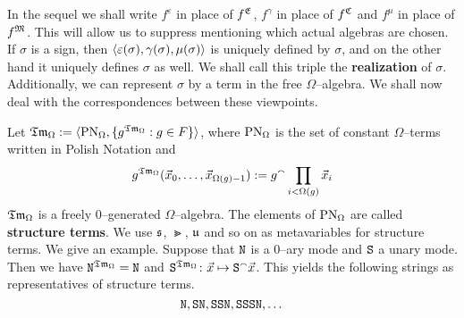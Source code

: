 In the sequel we shall write $f^{\varepsilon}$ in place of 
$f^{\mathfrak{E}}$, $f^{\gamma}$ in place of $f^{\mathfrak{C}}$ and $f^{\mu}$ in 
place of $f^{\mathfrak{M}}$. This will allow us to suppress mentioning 
which actual algebras are chosen. If $\sigma$ is a sign, then 
$\langle \varepsilon(\sigma), \gamma(\sigma), \mu(\sigma)\rangle$ is 
uniquely defined by $\sigma$, and on the other hand it uniquely 
defines $\sigma$ as well. We shall call this triple the 
\textbf{realization} of $\sigma$. Additionally,
we can represent $\sigma$ by a term in the free $\Omega$--algebra.
We shall now deal with the correspondences between these
viewpoints.

Let $\mathfrak{Tm}_{\Omega} := \langle \operatorname{PN}_{\Omega}, \{g^{\mathfrak{Tm}_{\Omega}} 
: g \in F\}\rangle$, where $\operatorname{PN}_{\Omega}$ is the set of constant $\Omega$--terms
written in Polish Notation and 
\begin{equation}
g^{\mathfrak{Tm}_{\Omega}}(\vec{x}_0, \dotsc, \vec{x}_{\Omega(g)-1}) :=
    g {^{\smallfrown}} \prod_{i < \Omega(g)} \vec{x}_i
\end{equation}
$\mathfrak{Tm}_{\Omega}$ is a freely 0--generated $\Omega$--algebra.
The elements of $\operatorname{PN}_{\Omega}$ are called 
\textbf{structure terms}.  We use $\mathfrak{s}$, $\Gt$, $\mathfrak{u}$ and so on 
as metavariables for structure terms. We give an example. Suppose 
that $\mbox{\tt N}$ is a
0--ary mode and $\mbox{\tt S}$ a unary mode. Then we have 
$\mbox{\tt N}^{\mathfrak{Tm}_{\Omega}} = \mbox{\tt N}$ and 
$\mbox{\tt S}^{\goth{Tm}_{\Omega}} %
\colon \vec{x} \mapsto \mbox{\tt S}\conc \vec{x}$. This yields
the following strings as representatives of structure terms.
\begin{equation}
\mbox{\tt N}, \mbox{\tt SN}, \mbox{\tt SSN},
\mbox{\tt SSSN}, \dotsc
\end{equation}

